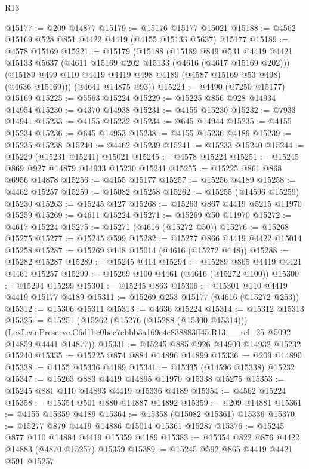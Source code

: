 \begin{lexlean}{R13}
\begin{coremodule}
@15177 := @209 @14877
@15179 := @15176 @15177 @15021
@15188 := @4562 @15169 @528 @851 @4422 @4419 (@4155 @15133 @5637) @15177
@15189 := @4578 @15169
@15221 := @15179
    (@15188
      (@15189
        @849
        @531
        @4419
        @4421
        @15133
        @5637
        (@4611 @15169 @202 @15133 (@4616 (@4617 @15169 @202)))
        (@15189 @499 @110 @4419 @4419 @498 @4189 (@4587 @15169 @53 @498) (@4636 @15169)))
      (@4641 @14875 @93))
@15224 := @4490 (@7250 @15177) @15169
@15225 := @5563 @15224
@15229 := @15225 @856 @928 @14934 @14954
@15230 := @4370 @14938
@15231 := @4155 @15230
@15232 := @7933 @14941
@15233 := @4155 @15232
@15234 := @645 @14944
@15235 := @4155 @15234
@15236 := @645 @14953
@15238 := @4155 @15236 @4189
@15239 := @15235 @15238
@15240 := @4462 @15239
@15241 := @15233 @15240
@15244 := @15229 (@15231 @15241) @15021
@15245 := @4578 @15224
@15251 := @15245 @869 @927 @14879 @14933 @15230 @15241
@15255 := @15225 @861 @868 @6956 @14878
@15256 := @4155 @15177
@15257 := @15256 @4189
@15258 := @4462 @15257
@15259 := @15082 @15258
@15262 := @15255 (@14596 @15259) @15230
@15263 := @15245 @127
@15268 := @15263 @867 @4419 @5215 @11970 @15259
@15269 := @4611 @15224
@15271 := @15269 @50 @11970
@15272 := @4617 @15224
@15275 := @15271 (@4616 (@15272 @50))
@15276 := @15268 @15275
@15277 := @15245 @599
@15282 := @15277 @866 @4419 @4422 @15014 @15258
@15287 := @15269 @148 @15014 (@4616 (@15272 @148))
@15288 := @15282 @15287
@15289 := @15245 @414
@15294 := @15289 @865 @4419 @4421 @4461 @15257
@15299 := @15269 @100 @4461 (@4616 (@15272 @100))
@15300 := @15294 @15299
@15301 := @15245 @863
@15306 := @15301 @110 @4419 @4419 @15177 @4189
@15311 := @15269 @253 @15177 (@4616 (@15272 @253))
@15312 := @15306 @15311
@15313 := @4636 @15224
@15314 := @15312 @15313
@15325 := @15251
    (@15262
      (@15276 (@15288 (@15300 @15314)))
      (LexLeanPreserve.C6d1bc0bcc7cbbb3a169c4e838883ff45.R13.__rel_25 @5092 @14859 @4441 @14877))
@15331 := @15245 @885 @926 @14900 @14932 @15232 @15240
@15335 := @15225 @874 @884 @14896 @14899
@15336 := @209 @14890
@15338 := @4155 @15336 @4189
@15341 := @15335 (@14596 @15338) @15232
@15347 := @15263 @883 @4419 @14895 @11970 @15338 @15275
@15353 := @15245 @881 @110 @14893 @4419 @15336 @4189
@15354 := @4562 @15224
@15358 := @15354 @501 @880 @14887 @14892
@15359 := @209 @14881
@15361 := @4155 @15359 @4189
@15364 := @15358 (@15082 @15361) @15336
@15370 := @15277 @879 @4419 @14886 @15014 @15361 @15287
@15376 := @15245 @877 @110 @14884 @4419 @15359 @4189
@15383 := @15354 @822 @876 @4422 @14883 (@4870 @15257) @15359
@15389 := @15245 @592 @865 @4419 @4421 @591 @15257

\end{coremodule}
\end{lexlean}
